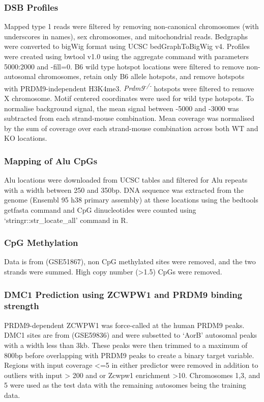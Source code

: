 \subsubsection{DSB Profiles}
Mapped type 1 reads were filtered by removing non-canonical chromosomes (with underscores in names), sex chromosomes, and mitochondrial reads. Bedgraphs were converted to bigWig format using UCSC bedGraphToBigWig v4. Profiles were created using bwtool v1.0 using the aggregate command with parameters 5000:2000 and -fill=0. B6 wild type hotspot locations were filtered to remove non-autosomal chromosomes, retain only B6 allele hotspots, and remove hotspots with PRDM9-independent H3K4me3. \textit{Prdm9\textsuperscript{-/-}} hotspots were filtered to remove X chromosome. Motif centered coordinates were used for wild type hotspots. To normalise background signal, the mean signal between -5000 and -3000 was subtracted from each strand-mouse combination. Mean coverage was normalised by the sum of coverage over each strand-mouse combination across both WT and KO locations.

\subsubsection{Mapping of Alu CpGs}
Alu locations were downloaded from UCSC tables and filtered for Alu repeats with a width between 250 and 350bp. DNA sequence was extracted from the genome (Ensembl 95 h38 primary assembly) at these locations using the bedtools getfasta command and CpG dinucleotides were counted using ‘stringr::str\_locate\_all’ command in R.

\subsubsection{CpG Methylation}
\label{sec:cpgmeth}
Data is from \parencite{Libertini2015Overexpression} (GSE51867), non CpG methylated sites were removed, and the two strands were summed. High copy number (>1.5) CpGs were removed.

\subsubsection{DMC1 Prediction using ZCWPW1 and PRDM9 binding strength}
\label{sec:prediction}
PRDM9-dependent ZCWPW1 was force-called at the human PRDM9 peaks. DMC1 sites are from \parencite{Pratto2014DNA} (GSE59836) and were subsetted to ‘AorB’ autosomal peaks with a width less than 3kb. These peaks were then trimmed to a maximum of 800bp before overlapping with PRDM9 peaks to create a binary target variable. Regions with input coverage <=5 in either predictor were removed in addition to outliers with input > 200 and or Zcwpw1 enrichment >10. Chromosomes 1,3, and 5 were used as the test data with the remaining autosomes being the training data.

